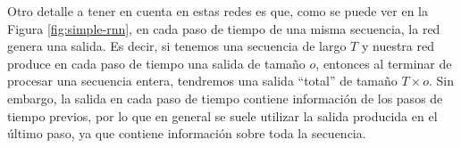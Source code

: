 \documentclass[../../main.tex]{subfiles}
\begin{document}
Otro detalle a tener en cuenta en estas redes es que, como se puede ver en la Figura
\ref{fig:simple-rnn}, en cada paso de tiempo de una misma secuencia, la red genera una
salida. Es decir, si tenemos una secuencia de largo \(T\) y nuestra red produce en cada
paso de tiempo una salida de tamaño \(o\), entonces al terminar de procesar una secuencia
entera, tendremos una salida ``total'' de tamaño \(T \times o\). Sin embargo,
la salida en cada paso de tiempo contiene información de los pasos de tiempo previos,
por lo que en general se suele utilizar la salida producida en el último paso, ya
que contiene información sobre toda la secuencia.

\end{document}
